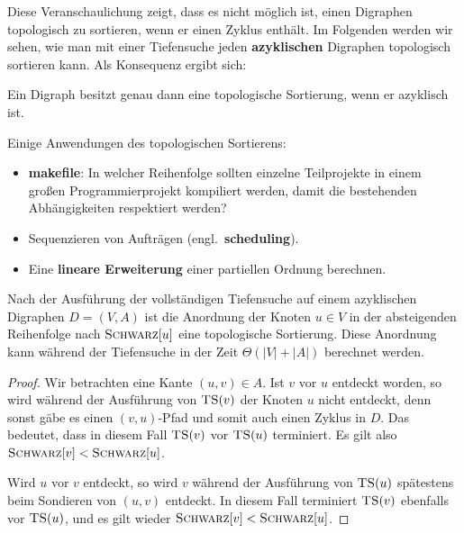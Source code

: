 \begin{bem}
Diese Veranschaulichung zeigt, dass es nicht möglich ist, einen Digraphen topologisch zu sortieren, wenn er einen Zyklus enthält.
Im Folgenden werden wir sehen, wie man mit einer Tiefensuche jeden \textbf{azyklischen} Digraphen topologisch sortieren kann.
Als Konsequenz ergibt sich:
\end{bem} 

\begin{prop}
Ein Digraph besitzt genau dann eine topologische Sortierung, wenn er azyklisch ist.
\end{prop}

\begin{bem}
Einige Anwendungen des topologischen Sortierens:
\begin{itemize}
 \item \textbf{makefile}: In welcher Reihenfolge sollten einzelne Teilprojekte in einem großen Programmierprojekt kompiliert werden, damit die bestehenden Abhängigkeiten respektiert werden?
 \item Sequenzieren von Aufträgen (engl.~\textbf{scheduling}).
 \item Eine \textbf{lineare Erweiterung} einer partiellen Ordnung berechnen.
\end{itemize}
\end{bem}


\begin{thm}
	Nach der Ausführung der vollständigen Tiefensuche auf einem azyklischen Digraphen $D=(V,A)$ ist die Anordnung der Knoten $u \in V$ in der absteigenden Reihenfolge nach $\mathop{\text{\textsc{Schwarz}}}[u]$ eine topologische Sortierung. Diese Anordnung kann während der Tiefensuche in der Zeit $\Theta(|V|+|A|)$ berechnet werden. 
\end{thm}

\begin{proof}
	Wir betrachten eine Kante $(u,v) \in A$. Ist $v$ vor $u$ entdeckt worden, so wird während der Ausführung von $\mathop{\text{\textsc{TS}}}(v)$ der Knoten $u$ nicht entdeckt, denn sonst gäbe es einen $(v,u)$-Pfad und somit auch einen Zyklus in $D$. Das bedeutet, dass in diesem Fall $\mathop{\text{\textsc{TS}}}(v)$ vor $\mathop{\text{\textsc{TS}}}(u)$ terminiert. Es gilt also $\mathop{\text{\textsc{Schwarz}}}[v] < \mathop{\text{\textsc{Schwarz}}}[u]$. 
	
	Wird $u$ vor $v$ entdeckt, so wird $v$ während der Ausführung von $\mathop{\text{\textsc{TS}}}(u)$ spätestens beim Sondieren von $(u,v)$ entdeckt. In diesem Fall terminiert $\mathop{\text{\textsc{TS}}}(v)$ ebenfalls vor $\mathop{\text{\textsc{TS}}}(u)$, und es gilt wieder $\mathop{\text{\textsc{Schwarz}}}[v] < \mathop{\text{\textsc{Schwarz}}}[u]$.
\end{proof}




